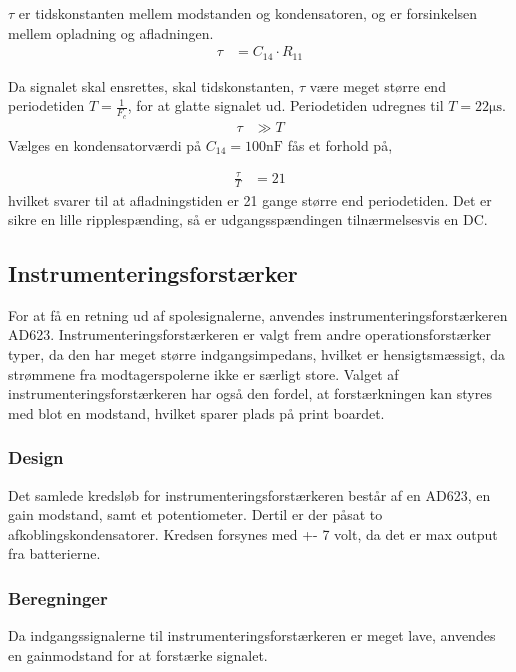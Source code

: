 $\tau$ er tidskonstanten mellem modstanden og kondensatoren, og er forsinkelsen mellem opladning og afladningen. 
\begin{align}
		\tau & = C_{14} \cdot R_{11}
\end{align}

Da signalet skal ensrettes, skal tidskonstanten, $\tau$ være meget større end periodetiden $T = \frac{1}{F_c}$, for at glatte signalet ud. Periodetiden udregnes til $T = 22 \si{\micro\second}$.
\begin{align}
		\tau & \gg T \nonumber
\end{align}
Vælges en kondensatorværdi på $C_{14} = 100 \si{\nano\farad}$ fås et forhold på,

\begin{align}
	\frac{\tau}{T} & = 21
\end{align}
hvilket svarer til at afladningstiden er 21 gange større end periodetiden. Det er sikre en lille ripplespænding, så er udgangsspændingen tilnærmelsesvis en DC.

\subsection{Instrumenteringsforstærker}
For at få en retning ud af spolesignalerne, anvendes instrumenteringsforstærkeren AD623. Instrumenteringsforstærkeren er valgt frem andre operationsforstærker typer, da den har meget større indgangsimpedans, hvilket er hensigtsmæssigt, da strømmene fra modtagerspolerne ikke er særligt store. Valget af instrumenteringsforstærkeren har også den fordel, at forstærkningen kan styres med blot en modstand, hvilket sparer plads på print boardet.


\subsubsection{Design}
Det samlede kredsløb for instrumenteringsforstærkeren består af en AD623, en gain modstand, samt et potentiometer. Dertil er der påsat to afkoblingskondensatorer. Kredsen forsynes med +- 7 volt, da det er max output fra batterierne. 


\subsubsection{Beregninger}
Da indgangssignalerne til instrumenteringsforstærkeren er meget lave, anvendes en gainmodstand for at forstærke signalet.

